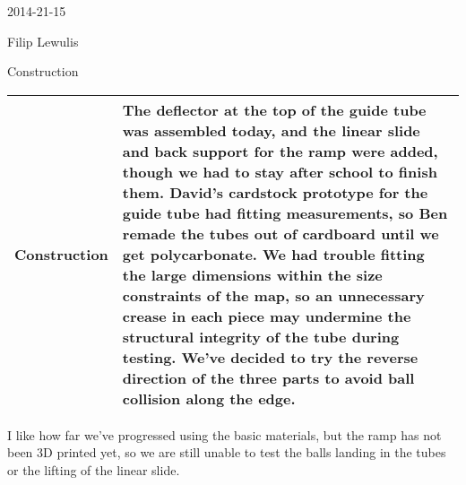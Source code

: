 2014-21-15

Filip Lewulis

Construction

\begin{tabular}{|p{5cm}|p{5cm}|}
\hline Construction &
The deflector at the top of the guide tube was assembled today, and the linear slide and back support for the ramp were added, though we had to stay after school to finish them. David's cardstock prototype for the guide tube had fitting measurements, so Ben remade the tubes out of cardboard until we get polycarbonate. We had trouble fitting the large dimensions within the size constraints of the map, so an unnecessary crease in each piece may undermine the structural integrity of the tube during testing. We've decided to try the reverse direction of the three parts to avoid ball collision along the edge. \\
\hline
\end{tabular}
I like how far we've progressed using the basic materials, but the ramp has not been 3D printed yet, so we are still unable to test the balls landing in the tubes or the lifting of the linear slide.
